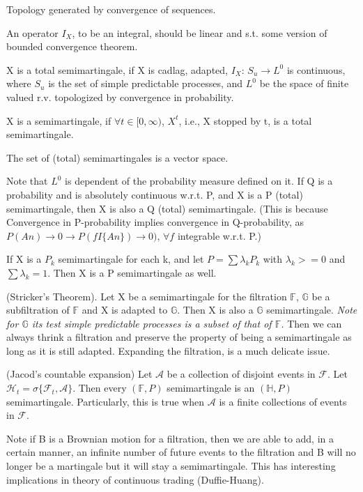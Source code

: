\documentclass[11pt,a4paper]{article}
\begin{document}
Topology generated by convergence of sequences.

An operator $ I_X $, to be an integral, should be linear and s.t. some version of bounded convergence theorem.

X is a total semimartingale, if X is cadlag, adapted, $ I_X $: $ S_u \to L^0 $ is continuous, where $ S_u $ is the set of simple predictable processes, and $ L^0 $ be the space of finite valued r.v. topologized by convergence in probability.

X is a semimartingale, if $ \forall t\in[0,\infty) $, $ X^t $, i.e., X stopped by t, is a total semimartingale.

The set of (total) semimartingales is a vector space.

Note that $ L^0 $ is dependent of the probability measure defined on it. If Q is a probability and is absolutely continuous w.r.t. P, and X is a P (total) semimartingale, then X is also a Q (total) semimartingale. (This is because Convergence in P-probability implies convergence in Q-probability, as $ P(An)\to 0 \rightarrow P(fI\{An\})\to 0) $, $ \forall f  $ integrable w.r.t. P.)

If X is a $ P_k $ semimartingale  for each k, and let $ P=\sum \lambda_k P_k $ with $ \lambda_k>=0 $ and $ \sum \lambda_k=1 $. Then X is a P semimartingale as well.

(Stricker's Theorem). Let X be a semimartingale for the filtration $ \mathbb{F} $, $ \mathbb{G} $ be a subfiltration of $ \mathbb{F} $ and  X is adapted to $ \mathbb{G} $. Then X is also a $ \mathbb{G} $ semimartingale. {\em Note for $ \mathbb{G} $ its test simple predictable processes is a subset of that of $ \mathbb{F} $.} Then we can always thrink a filtration and preserve the property of being a semimartingale as long as it is still adapted. Expanding the filtration, is a much delicate issue.  

(Jacod's countable expansion) Let $ \mathcal{A} $ be a collection of disjoint events in $ \mathcal{F} $. Let $ \mathcal{H}_t=\sigma\{\mathcal{F}_t,\mathcal{A}\} $. Then every $ (\mathbb{F}, P) $ semimartingale is an $ (\mathbb{H},P) $ semimartingale.  Particularly, this is true when $\mathcal{A} $ is a finite collections of events in $ \mathcal{F} $.

Note if B is a Brownian motion for a filtration, then we are able to add, in a certain manner, an infinite number of future events to the filtration and B will no longer be a martingale but it will stay a semimartingale. This has interesting implications in theory of continuous trading (Duffie-Huang).
\end{document}

